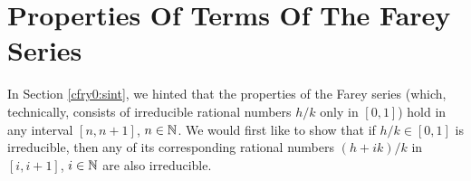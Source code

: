 
\section{Properties Of Terms Of The Farey Series}

In Section \ref{cfry0:sint}, we hinted that the properties
of the Farey series (which, technically,
consists of irreducible rational numbers $h/k$
only in $[0,1]$) hold in any interval $[n,n+1]$,
$n \in {\mathbb{N}}$.  We would first like to show
that if $h/k \in [0,1]$ is irreducible, then
any of its corresponding rational numbers $(h+ik)/k$ in
$[i,i+1]$, $i \in {\mathbb{N}}$ are also irreducible.

